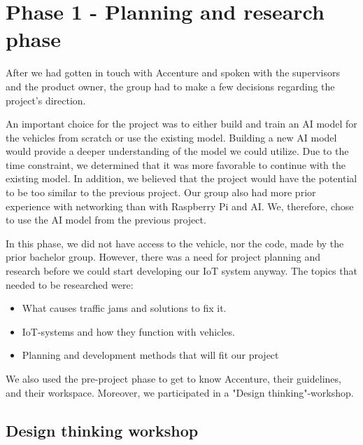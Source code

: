 \section{Phase 1 - Planning and research phase}

After we had gotten in touch with Accenture and spoken with the supervisors and the product owner, the group had to make a few decisions regarding the project's direction.

An important choice for the project was to either build and train an AI model for the vehicles from scratch or use the existing model. Building a new AI model would provide a deeper understanding of the model we could utilize. Due to the time constraint, we determined that it was more favorable to continue with the existing model. In addition, we believed that the project would have the potential to be too similar to the previous project.  Our group also had more prior experience with networking than with Raspberry Pi and AI. We, therefore, chose to use the AI model from the previous project. 

In this phase, we did not have access to the vehicle, nor the code, made by the prior bachelor group. However, there was a need for project planning and research before we could start developing our IoT system anyway. The topics that needed to be researched were:

\begin{itemize}
\item What causes traffic jams and solutions to fix it.
\item IoT-systems and how they function with vehicles.
\item Planning and development methods that will fit our project
\end{itemize}

We also used the pre-project phase to get to know Accenture, their guidelines, and their workspace. Moreover, we participated in a "Design thinking"-workshop. 

\subsection{Design thinking workshop}








\clearpage